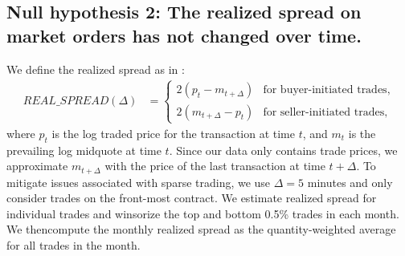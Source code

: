 \documentclass[hidelinks, 11pt]{article}
\begin{document}



\subsection{Null hypothesis 2: The realized spread on market orders has not changed over time.}\label{sec:cot}


We define the realized spread as in \cite{goyenko2009liquidity}:
\begin{align}
REAL\_SPREAD(\Delta) &= \left\{
\begin{array}{ll}
2(p_{t} - m_{t+\Delta}) & \text{for buyer-initiated trades}, \\
2(m_{t+\Delta} - p_{t}) & \text{for seller-initiated trades},
\end{array}\right.
\end{align}
where $p_t$ is the log traded price for the transaction at time $t$, and $m_t$ is the prevailing log midquote at time $t$. Since our data only contains trade prices, we approximate $m_{t+\Delta}$ with the price of the last transaction at time $t+\Delta$. To mitigate issues associated with sparse trading, we use $\Delta=5$ minutes and only consider trades on the front-most contract. We estimate realized spread for individual trades and winsorize the top and bottom 0.5\% trades in each month. We thencompute the monthly realized spread as the quantity-weighted average for all trades in the month. %





\end{document}
